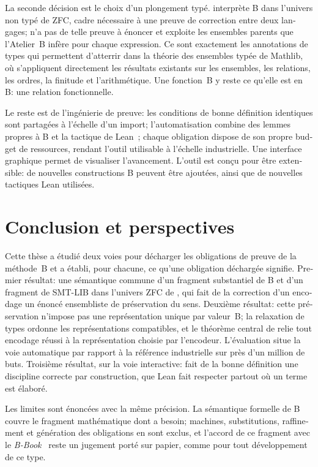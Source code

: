 \begin{otherlanguage}{french}
La seconde décision est le choix d'un plongement typé. \beer{} interprète B
dans l'univers non typé de ZFC, cadre nécessaire à une preuve de correction
entre deux langages; \barrel{} n'a pas de telle preuve à énoncer et exploite
les ensembles parents que l'Atelier~B infère pour chaque expression. Ce sont
exactement les annotations de types qui permettent d'atterrir dans la théorie
des ensembles typée de Mathlib, où s'appliquent directement les résultats
existants sur les ensembles, les relations, les ordres, la finitude et
l'arithmétique. Une fonction~B y reste ce qu'elle est en B: une relation
fonctionnelle.

Le reste est de l'ingénierie de preuve: les conditions de bonne définition
identiques sont partagées à l'échelle d'un import; l'automatisation combine
des lemmes propres à B et la tactique  de
Lean~\cite{LeanReferenceManual}; chaque
obligation dispose de son propre budget de ressources, rendant l'outil utilisable
à l'échelle industrielle. Une interface graphique permet de visualiser l'avancement.
L'outil est conçu pour être extensible: de nouvelles constructions B peuvent
être ajoutées, ainsi que de nouvelles tactiques Lean utilisées.

\section*{Conclusion et perspectives}

Cette thèse a étudié deux voies pour décharger les obligations de preuve de
la méthode~B et a établi, pour chacune, ce qu'une obligation déchargée
signifie. Premier résultat: une sémantique commune d'un fragment substantiel
de B et d'un fragment de SMT-LIB dans l'univers ZFC de \zflean{}, qui fait de
la correction d'un encodage un énoncé ensembliste de préservation du sens.
Deuxième résultat: cette préservation n'impose pas une représentation unique par
valeur~B; la relaxation de types ordonne les représentations compatibles, et
le théorème central de \beer{} relie tout encodage réussi à la représentation
choisie par l'encodeur. L'évaluation situe la voie automatique par rapport à la
référence industrielle sur près d'un million de buts.
Troisième résultat, sur la voie interactive: \barrel{} fait de la
bonne définition une discipline correcte par construction, que Lean fait
respecter partout où un terme est élaboré.

Les limites sont énoncées avec la même précision. La sémantique formelle de B
couvre le fragment mathématique dont \beer{} a besoin; machines,
substitutions, raffinement et génération des obligations en sont exclus, et
l'accord de ce fragment avec le \emph{B-Book}~\cite{abrial1996bbook} reste un
jugement porté sur papier, comme pour tout développement de ce type.


\end{otherlanguage}
